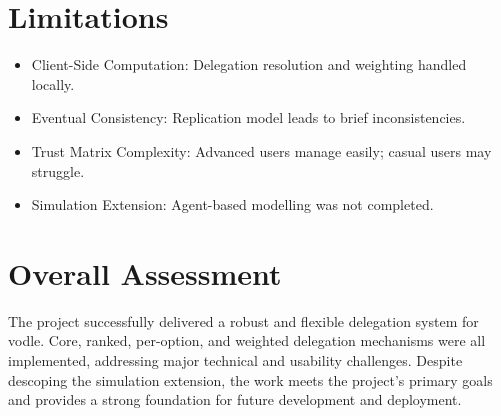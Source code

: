 \section{Limitations}

\begin{itemize}
    \item Client-Side Computation: Delegation resolution and weighting handled locally.
    \item Eventual Consistency: Replication model leads to brief inconsistencies.
    \item Trust Matrix Complexity: Advanced users manage easily; casual users may struggle.
    \item Simulation Extension: Agent-based modelling was not completed.
\end{itemize}

\section{Overall Assessment}

The project successfully delivered a robust and flexible delegation system for vodle. Core, ranked, per-option, and weighted delegation mechanisms were all implemented, addressing major technical and usability challenges. Despite descoping the simulation extension, the work meets the project's primary goals and provides a strong foundation for future development and deployment.
